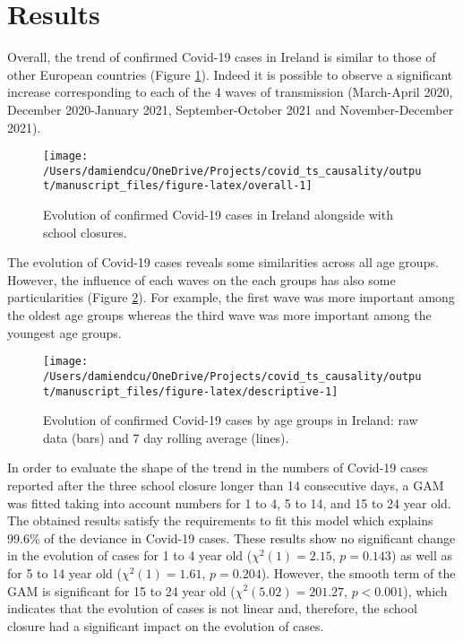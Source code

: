 \documentclass[]{elsarticle} %
\begin{document}
\hypertarget{results}{%
\section{Results}\label{results}}

Overall, the trend of confirmed Covid-19 cases in Ireland is similar to those of other European countries (Figure \ref{fig:overall}). Indeed it is possible to observe a significant increase corresponding to each of the 4 waves of transmission (March-April 2020, December 2020-January 2021, September-October 2021 and November-December 2021).

\begin{figure}[!h]
\texttt{[image: /Users/damiendcu/OneDrive/Projects/covid\_ts\_causality/output/manuscript\_files/figure-latex/overall-1]} \caption{Evolution of confirmed Covid-19 cases in Ireland alongside with school closures.}\label{fig:overall}
\end{figure}

The evolution of Covid-19 cases reveals some similarities across all age groups. However, the influence of each waves on the each groups has also some particularities (Figure \ref{fig:descriptive}). For example, the first wave was more important among the oldest age groups whereas the third wave was more important among the youngest age groups.

\begin{figure}
\texttt{[image: /Users/damiendcu/OneDrive/Projects/covid\_ts\_causality/output/manuscript\_files/figure-latex/descriptive-1]} \caption{Evolution of confirmed Covid-19 cases by age groups in Ireland: raw data (bars) and 7 day rolling average (lines).}\label{fig:descriptive}
\end{figure}

In order to evaluate the shape of the trend in the numbers of Covid-19 cases reported after the three school closure longer than 14 consecutive days, a GAM was fitted taking into account numbers for 1 to 4, 5 to 14, and 15 to 24 year old. The obtained results satisfy the requirements to fit this model which explains 99.6\% of the deviance in Covid-19 cases. These results show no significant change in the evolution of cases for 1 to 4 year old (\(\chi^2(1) = 2.15\), \(p = 0.143\)) as well as for 5 to 14 year old (\(\chi^2(1) = 1.61\), \(p = 0.204\)). However, the smooth term of the GAM is significant for 15 to 24 year old (\(\chi^2(5.02) = 201.27\), \(p < 0.001\)), which indicates that the evolution of cases is not linear and, therefore, the school closure had a significant impact on the evolution of cases.
\end{document}

